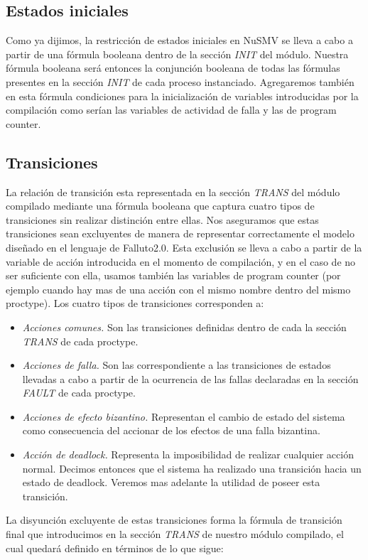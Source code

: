 \documentclass[titlepage, 12pt]{book}
\begin{document}
\subsection*{Estados iniciales}
Como ya dijimos, la restricci\'on de estados iniciales en NuSMV se lleva a cabo a partir de una f\'ormula booleana dentro de la secci\'on \textit{INIT} del m\'odulo. Nuestra f\'ormula booleana ser\'a entonces la conjunci\'on booleana de todas las f\'ormulas presentes en la secci\'on \textit{INIT} de cada proceso instanciado. Agregaremos tambi\'en en esta f\'ormula condiciones para la inicializaci\'on de variables introducidas por la compilaci\'on como ser\'ian las variables de actividad de falla y las de program counter.

\subsection*{Transiciones}
La relaci\'on de transici\'on esta representada en la secci\'on \textit{TRANS} del m\'odulo compilado mediante una f\'ormula booleana que captura cuatro tipos de transiciones sin realizar distinci\'on entre ellas. Nos aseguramos que estas transiciones sean excluyentes de manera de representar correctamente el modelo dise\~nado en el lenguaje de Falluto2.0. Esta exclusi\'on se lleva a cabo a partir de la variable de acci\'on introducida en el momento de compilaci\'on, y en el caso de no ser suficiente con ella, usamos tambi\'en las variables de program counter (por ejemplo cuando hay mas de una acci\'on con el mismo nombre dentro del mismo proctype). Los cuatro tipos de transiciones corresponden a:

\begin{itemize}
\item \textit{Acciones comunes.} Son las transiciones definidas dentro de cada la secci\'on \textit{TRANS} de cada proctype.
\item \textit{Acciones de falla.} Son las correspondiente a las transiciones de estados llevadas a cabo a partir de la ocurrencia de las fallas declaradas en la secci\'on \textit{FAULT} de cada proctype.
\item \textit{Acciones de efecto bizantino.} Representan el cambio de estado del sistema como consecuencia del accionar de los efectos de una falla bizantina.
\item \textit{Acci\'on de deadlock.} Representa la imposibilidad de realizar cualquier acci\'on normal. Decimos entonces que el sistema ha realizado una transici\'on hacia un estado de deadlock. Veremos mas adelante la utilidad de poseer esta transici\'on.
\end{itemize}
La disyunci\'on excluyente de estas transiciones forma la f\'ormula de transici\'on final que introducimos en la secci\'on \textit{TRANS} de nuestro m\'odulo compilado, el cual quedar\'a definido en t\'erminos de lo que sigue:\\
\end{document}
